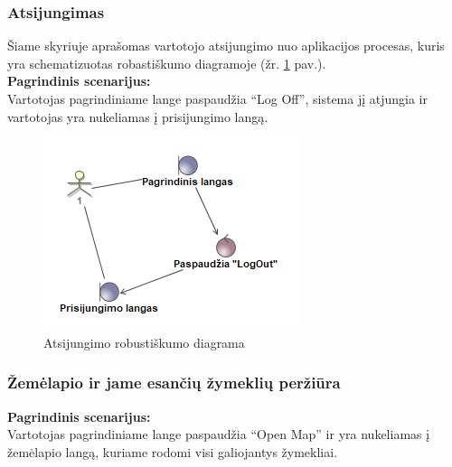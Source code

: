 \documentclass{VUMIFPSkursinis}
\begin{document}
\subsubsection{Atsijungimas}
	Šiame skyriuje aprašomas vartotojo atsijungimo nuo aplikacijos procesas, kuris yra schematizuotas robastiškumo diagramoje (žr. \ref{img:Atsijungimo robustiškumo diagrama} pav.).\\
	\textbf{Pagrindinis scenarijus:}\\
	Vartotojas pagrindiniame lange paspaudžia “Log Off”, sistema jį atjungia ir vartotojas yra nukeliamas į prisijungimo langą.
		\begin{figure}[H]
				\centering
				\includegraphics[scale=1]{img/Robustness_Atsijungimas}
				\caption{Atsijungimo robustiškumo diagrama}
				\label{img:Atsijungimo robustiškumo diagrama}
			\end{figure}

\subsubsection{Žemėlapio ir jame esančių žymeklių peržiūra}
	\textbf{Pagrindinis scenarijus:}\\
	Vartotojas pagrindiniame lange paspaudžia “Open Map” ir yra nukeliamas į žemėlapio langą, kuriame rodomi visi galiojantys žymekliai.
\end{document}
